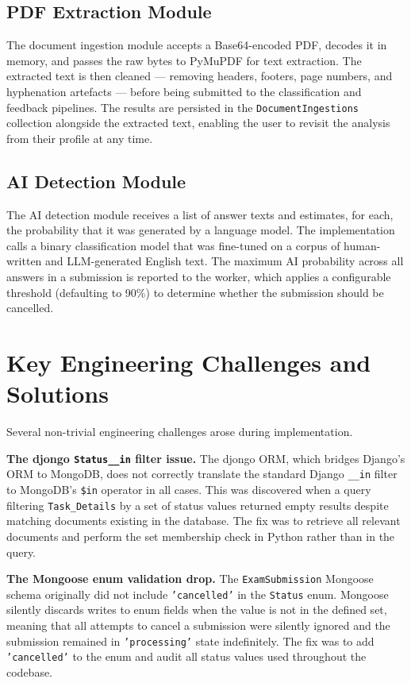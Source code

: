 \documentclass[12pt, a4paper]{report}
\begin{document}
\subsection{PDF Extraction Module}

The document ingestion module accepts a Base64-encoded PDF, decodes it in memory, and passes the raw bytes to PyMuPDF for text extraction. The extracted text is then cleaned — removing headers, footers, page numbers, and hyphenation artefacts — before being submitted to the classification and feedback pipelines. The results are persisted in the \texttt{DocumentIngestions} collection alongside the extracted text, enabling the user to revisit the analysis from their profile at any time.

\subsection{AI Detection Module}

The AI detection module receives a list of answer texts and estimates, for each, the probability that it was generated by a language model. The implementation calls a binary classification model that was fine-tuned on a corpus of human-written and LLM-generated English text. The maximum AI probability across all answers in a submission is reported to the worker, which applies a configurable threshold (defaulting to 90\%) to determine whether the submission should be cancelled.

\section{Key Engineering Challenges and Solutions}

Several non-trivial engineering challenges arose during implementation.

\textbf{The djongo \texttt{Status\_\_in} filter issue.} The djongo ORM, which bridges Django's ORM to MongoDB, does not correctly translate the standard Django \texttt{\_\_in} filter to MongoDB's \texttt{\$in} operator in all cases. This was discovered when a query filtering \texttt{Task\_Details} by a set of status values returned empty results despite matching documents existing in the database. The fix was to retrieve all relevant documents and perform the set membership check in Python rather than in the query.

\textbf{The Mongoose enum validation drop.} The \texttt{ExamSubmission} Mongoose schema originally did not include \texttt{'cancelled'} in the \texttt{Status} enum. Mongoose silently discards writes to enum fields when the value is not in the defined set, meaning that all attempts to cancel a submission were silently ignored and the submission remained in \texttt{'processing'} state indefinitely. The fix was to add \texttt{'cancelled'} to the enum and audit all status values used throughout the codebase.
\end{document}
